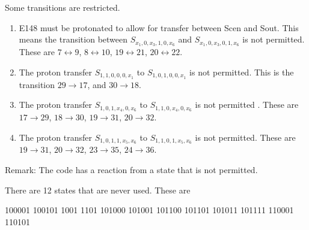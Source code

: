 \documentclass[12pt]{article}
\begin{document}
Some transitions are restricted.
\begin{enumerate}
\item  E148 must be protonated to allow for transfer between Scen and Sout.    This means the transition between $S_{x_1,0,x_3,1,0,x_6}$ and $S_{x_1,0,x_3,0,1,x_6}$ is not permitted. These are $7\leftrightarrow 9$, $8\leftrightarrow 10$, $19\leftrightarrow 21$, $20\leftrightarrow 22$.

 \item
The proton  transfer $S_{1,1,0,0,0,x_1}$ to  $S_{1,0,1,0,0,x_1} $ is not permitted.  This  is the transition  $29\rightarrow 17$,   and $30\rightarrow 18$.
\item
The proton transfer $S_{1,0,1,x_4,0,x_6}$ to $S_{1,1,0,x_4,0,x_6}$ is not permitted .  These are $17\rightarrow 29 $, $18\rightarrow 30$, $19\rightarrow 31$, $20\rightarrow 32$.

\item  The proton transfer $S_{1,0,1,1,x_5,x_6}$ to $S_{1,1,0,1,x_5,x_6}$ is not permitted.   These are  $19\rightarrow 31$, $20\rightarrow 32$, $23\rightarrow 35$, $24\rightarrow 36$. \end{enumerate}


Remark:  The code has a reaction from a state that is not permitted.

There are 12 states that are never used.  These are

  100001      100101        1001        1101      101000      101001      101100      101101      101011      101111      110001      110101
\end{document}
